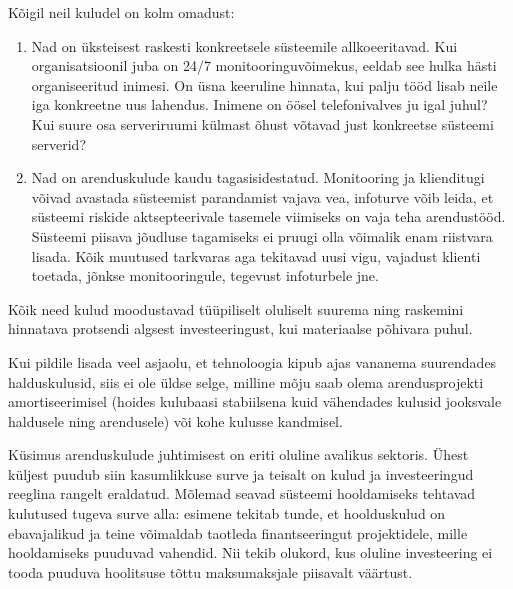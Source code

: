 Kõigil neil kuludel on kolm omadust:
\begin{enumerate}
	\item Nad on üksteisest raskesti konkreetsele süsteemile allkoeeritavad. Kui organisatsioonil juba on 24/7 monitooringuvõimekus, eeldab see hulka hästi organiseeritud inimesi. On üsna keeruline hinnata, kui palju tööd lisab neile iga konkreetne uus lahendus. Inimene on öösel telefonivalves ju igal juhul? Kui suure osa serveriruumi külmast õhust võtavad just konkreetse süsteemi serverid?
	\item Nad on arenduskulude kaudu tagasisidestatud. Monitooring ja klienditugi võivad avastada süsteemist parandamist vajava vea, infoturve võib leida, et süsteemi riskide aktsepteerivale tasemele viimiseks on vaja teha arendustööd. Süsteemi piisava jõudluse tagamiseks ei pruugi olla võimalik enam riistvara lisada. Kõik muutused tarkvaras aga tekitavad uusi vigu, vajadust klienti toetada, jõnkse monitooringule, tegevust infoturbele jne. 
\end{enumerate}

Kõik need kulud moodustavad tüüpiliselt oluliselt suurema ning raskemini hinnatava protsendi algsest investeeringust, kui materiaalse põhivara puhul. 

Kui pildile lisada veel asjaolu, et tehnoloogia kipub ajas vananema suurendades halduskulusid, siis ei ole üldse selge, milline mõju saab olema arendusprojekti amortiseerimisel (hoides kulubaasi stabiilsena kuid vähendades kulusid jooksvale haldusele ning arendusele) või kohe kulusse kandmisel.

Küsimus arenduskulude juhtimisest on eriti oluline avalikus sektoris. Ühest küljest puudub siin kasumlikkuse surve ja teisalt on kulud ja investeeringud reeglina rangelt eraldatud. Mõlemad seavad süsteemi hooldamiseks tehtavad kulutused tugeva surve alla: esimene tekitab tunde, et hoolduskulud on ebavajalikud ja teine võimaldab taotleda finantseeringut projektidele, mille hooldamiseks puuduvad vahendid. Nii tekib olukord, kus oluline investeering ei tooda puuduva hoolitsuse tõttu maksumaksjale piisavalt väärtust. 


